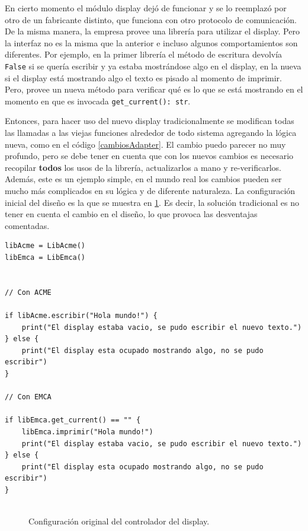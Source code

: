 En cierto momento el módulo display dejó de funcionar y se lo reemplazó por otro de un fabricante distinto, que funciona con otro protocolo de comunicación. De la misma manera, la empresa provee una librería para utilizar el display. Pero la interfaz no es la misma que la anterior e incluso algunos comportamientos son diferentes. Por ejemplo, en la primer librería el método de escritura devolvía \verb|False| si se quería escribir y ya estaba mostrándose algo en el display, en la nueva si el display está mostrando algo el texto es pisado al momento de imprimir. Pero, provee un nueva método para verificar qué es lo que se está mostrando en el momento en que es invocada \verb|get_current(): str|.

Entonces, para hacer uso del nuevo display tradicionalmente se modifican todas las llamadas a las viejas funciones alrededor de todo sistema agregando la lógica nueva, como en el código \ref{cambiosAdapter}. El cambio puedo parecer no muy profundo, pero se debe tener en cuenta que con los nuevos cambios es necesario recopilar \textbf{todos} los usos de la librería, actualizarlos a mano y re-verificarlos. Además, este es un ejemplo simple, en el mundo real los cambios pueden ser mucho más complicados en su lógica y de diferente naturaleza. La configuración inicial del diseño es la que se muestra en \ref{configOri}. Es decir, la solución tradicional es no tener en cuenta el cambio en el diseño, lo que provoca las desventajas comentadas.

\begin{lstlisting}[label={cambiosAdapter}, caption=Ejemplo de modificaciones necesarias para adaptar la nueva librería.]
libAcme = LibAcme()
libEmca = LibEmca()


// Con ACME

if libAcme.escribir("Hola mundo!") {
	print("El display estaba vacio, se pudo escribir el nuevo texto.")
} else {
	print("El display esta ocupado mostrando algo, no se pudo escribir")
}

// Con EMCA

if libEmca.get_current() == "" {
	libEmca.imprimir("Hola mundo!")
	print("El display estaba vacio, se pudo escribir el nuevo texto.")
} else {
	print("El display esta ocupado mostrando algo, no se pudo escribir")
}


\end{lstlisting}


\begin{figure}[!h]
\caption{Configuración original del controlador del display.}
\label{configOri}
\begin{center}
\end{center}
\end{figure}


